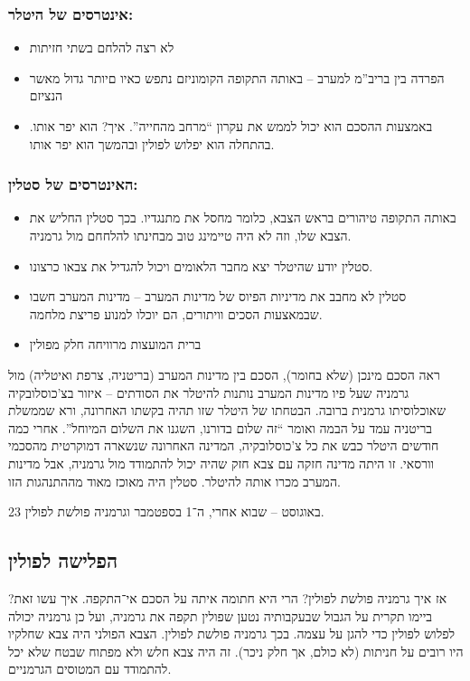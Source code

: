 \documentclass[a4paper]{book}
\begin{document}
	\subsubsection{אינטרסים של היטלר: }
	\begin{itemize}
		\item לא רצה להלחם בשתי חזיתות
		\item הפרדה בין בריב''מ למערב – באותה התקופה הקומוניזם נתפש כאיו םיותר גדול מאשר הנציזם
		\item באמצעות ההסכם הוא יכול לממש את עקרון ``מרחב מהחייה''. איך? הוא יפר אותו. בהתחלה הוא יפלוש לפולין ובהמשך הוא יפר אותו. 
	\end{itemize}
	
	\subsubsection{האינטרסים של סטלין: }
	\begin{itemize}
		\item באותה התקופה טיהורים בראש הצבא, כלומר מחסל את מתנגדיו. בכך סטלין החליש את הצבא שלו, וזה לא היה טיימינג טוב מבחינתו להלחחם מול גרמניה.
		\item סטלין יודע שהיטלר יצא מחבר הלאומים ויכול להגדיל את צבאו כרצונו. 
		\item סטלין לא מחבב את מדיניות הפיוס של מדינות המערב – מדינות המערב חשבו שבמאצעות הסכים וויתורים, הם יוכלו למנוע פריצת מלחמה. 
		\item ברית המועצות מרוויחה חלק מפולין
	\end{itemize}
	
	ראה הסכם מינכן (שלא בחומר), הסכם בין מדינות המערב (בריטניה, צרפת ואיטליה) מול גרמניה שעל פיו מדינות המערב נותנות להיטלר את הסודתים – איזור בצ'כוסלובקיה שאוכלוסיתו גרמנית ברובה. הבטחתו של היטלר שזו תהיה בקשתו האחרונה, ורא שממשלת בריטניה עמד על הבמה ואומר ``זה שלום בדורנו, השגנו את השלום המיוחל''. אחרי כמה חודשים היטלר כבש את כל צ'כוסלובקיה, המדינה האחרונה שנשארה דמוקרטית מהסכמי וורסאי. זו היתה מדינה חזקה עם צבא חזק שהיה יכול להתמודד מול גרמניה, אבל מדינות המערב מכרו אותה להיטלר. סטלין היה מאוכז מאוד מההתנהגות הזו. 
	
	23 באוגוסט – שבוא אחרי, ה־1 בספטמבר וגרמניה פולשת לפולין. 
	
	\subsection{הפלישה לפולין}
	אז איך גרמניה פולשת לפולין? הרי היא חתומה איתה על הסכם אי־התקפה. איך עשו זאת? ביימו תקרית על הגבול שבעקבותיה נטען שפולין תקפה את גרמניה, ועל כן גרמניה יכולה לפלוש לפולין כדי להגן על עצמה. בכך גרמניה פולשת לפולין. הצבא הפולני היה צבא שחלקיו היו רובים על חניתות (לא כולם, אך חלק ניכר). זה היה צבא חלש ולא מפתוח שבטח שלא יכל להתמודד עם המטוסים הגרמניים. 
	
\end{document}
